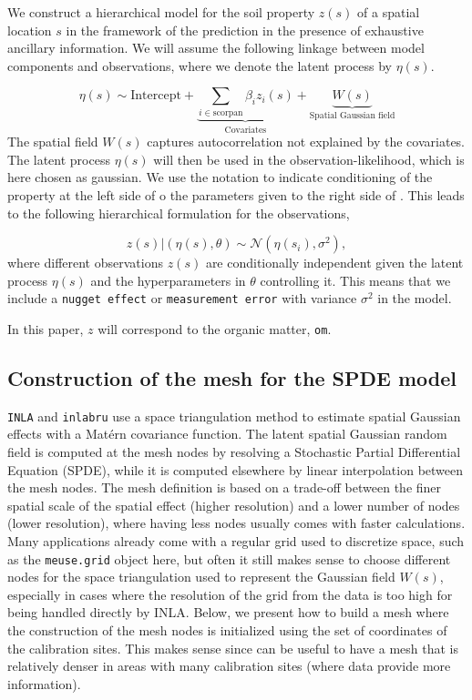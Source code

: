 \documentclass[
  a4paper,
]{article}
\begin{document}
We construct a hierarchical model for the soil property \(z(s)\) of a
spatial location \(s\) in the framework of the prediction in the
presence of exhaustive ancillary information. We will assume the
following linkage between model components and observations, where we
denote the latent process by \(\eta(s)\).

\[
\eta(s) \sim {\text{Intercept}} + \underbrace{ \sum_{i\in \text{scorpan}}\beta_i z_i(s)}_{\text{Covariates} } +\underbrace{W(s)}_{\text{Spatial Gaussian field}}
\] The spatial field \(W(s)\) captures autocorrelation not explained by
the covariates. The latent process \(\eta(s)\) will then be used in the
observation-likelihood, which is here chosen as gaussian. We use the
\texttt{\textbar{}} notation to indicate conditioning of the property at
the left side of \texttt{\textbar{}} o the parameters given to the right
side of \texttt{\textbar{}}. This leads to the following hierarchical
formulation for the observations,

\[
z(s) | (\eta(s),\theta) \sim \mathcal{N}(\eta(s_i), \sigma^2),
\] where different observations \(z(s)\) are conditionally independent
given the latent process \(\eta(s)\) and the hyperparameters in
\(\theta\) controlling it. This means that we include a
\texttt{nugget\ effect} or \texttt{measurement\ error} with variance
\(\sigma^2\) in the model.

In this paper, \(z\) will correspond to the organic matter, \texttt{om}.

\hypertarget{construction-of-the-mesh-for-the-spde-model}{%
\subsection{Construction of the mesh for the SPDE
model}\label{construction-of-the-mesh-for-the-spde-model}}

\texttt{INLA} and \texttt{inlabru} use a space triangulation method to
estimate spatial Gaussian effects with a Matérn covariance function. The
latent spatial Gaussian random field is computed at the mesh nodes by
resolving a Stochastic Partial Differential Equation (SPDE), while it is
computed elsewhere by linear interpolation between the mesh nodes. The
mesh definition is based on a trade-off between the finer spatial scale
of the spatial effect (higher resolution) and a lower number of nodes
(lower resolution), where having less nodes usually comes with faster
calculations. Many applications already come with a regular grid used to
discretize space, such as the \texttt{meuse.grid} object here, but often
it still makes sense to choose different nodes for the space
triangulation used to represent the Gaussian field \(W(s)\), especially
in cases where the resolution of the grid from the data is too high for
being handled directly by INLA. Below, we present how to build a mesh
where the construction of the mesh nodes is initialized using the set of
coordinates of the calibration sites. This makes sense since can be
useful to have a mesh that is relatively denser in areas with many
calibration sites (where data provide more information).
\end{document}
